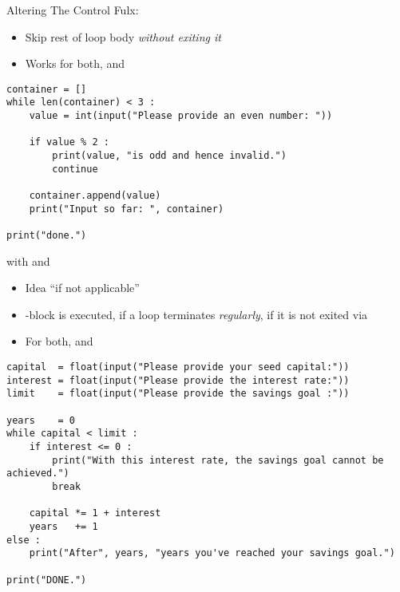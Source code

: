
\begin{frame}[fragile]{Altering The Control Fulx: }
%
\begin{itemize}
\item Skip rest of loop body \emph{without exiting it}
\item Works for both,  and 
\end{itemize}
%
\begin{codebox}
\begin{verbatim}
container = []
while len(container) < 3 :
    value = int(input("Please provide an even number: "))
    
    if value % 2 :
        print(value, "is odd and hence invalid.")
        continue
        
    container.append(value)
    print("Input so far: ", container)

print("done.")
\end{verbatim}
\end{codebox}
%
\end{frame}


\begin{frame}[fragile]{ with  and }
%
\begin{itemize}
\item Idea \enquote{if not applicable}
\item {}-block is executed, if a loop terminates \emph{regularly}, \ie if it is not exited via 
\item For both,  and 
\end{itemize}
%
\end{frame}


\begin{frame}[fragile]
%
\begin{codebox}
\begin{verbatim}
capital  = float(input("Please provide your seed capital:"))
interest = float(input("Please provide the interest rate:"))
limit    = float(input("Please provide the savings goal :"))

years    = 0
while capital < limit :
    if interest <= 0 :
        print("With this interest rate, the savings goal cannot be achieved.")
        break
    
    capital *= 1 + interest
    years   += 1
else :
    print("After", years, "years you've reached your savings goal.")
  
print("DONE.")
\end{verbatim}
\end{codebox}
%
\end{frame}


